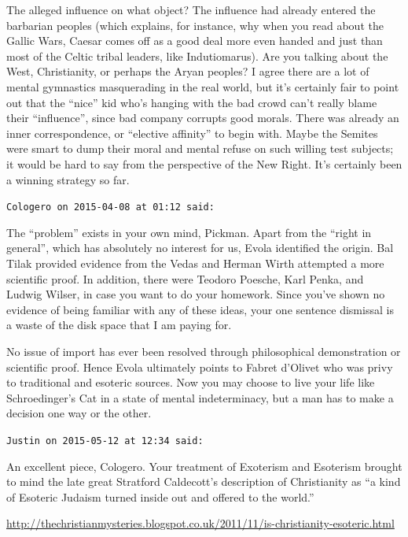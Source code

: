 \begin{footnotesize}
\begin{sffamily}
The alleged influence on what object? The influence had already entered the barbarian peoples (which explains, for instance, why when you read about the Gallic Wars, Caesar comes off as a good deal more even handed and just than most of the Celtic tribal leaders, like Indutiomarus). Are you talking about the West, Christianity, or perhaps the Aryan peoples? I agree there are a lot of mental gymnastics masquerading in the real world, but it's certainly fair to point out that the ``nice'' kid who's hanging with the bad crowd can't really blame their ``influence'', since bad company corrupts good morals. There was already an inner correspondence, or ``elective affinity'' to begin with. Maybe the Semites were smart to dump their moral and mental refuse on such willing test subjects; it would be hard to say from the perspective of the New Right. It's certainly been a winning strategy so far.

\hfill

\texttt{Cologero on 2015-04-08 at 01:12 said:}

The ``problem'' exists in your own mind, Pickman. Apart from the ``right in general'', which has absolutely no interest for us, Evola identified the origin. Bal Tilak provided evidence from the Vedas and Herman Wirth attempted a more scientific proof. In addition, there were Teodoro Poesche, Karl Penka, and Ludwig Wilser, in case you want to do your homework. Since you've shown no evidence of being familiar with any of these ideas, your one sentence dismissal is a waste of the disk space that I am paying for.

No issue of import has ever been resolved through philosophical demonstration or scientific proof. Hence Evola ultimately points to Fabret d'Olivet who was privy to traditional and esoteric sources. Now you may choose to live your life like Schroedinger's Cat in a state of mental indeterminacy, but a man has to make a decision one way or the other.

\hfill

\texttt{Justin on 2015-05-12 at 12:34 said:}

An excellent piece, Cologero. Your treatment of Exoterism and Esoterism brought to mind the late great Stratford Caldecott's description of Christianity as ``a kind of Esoteric Judaism turned inside out and offered to the world.''

\url{http://thechristianmysteries.blogspot.co.uk/2011/11/is-christianity-esoteric.html}


\end{sffamily}
\end{footnotesize}

